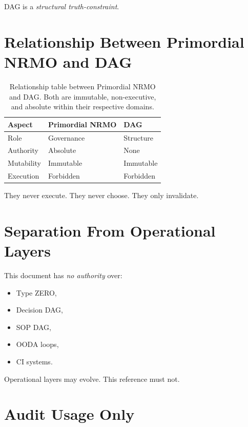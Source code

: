 \noindent
DAG is a \emph{structural truth-constraint}.

\section{Relationship Between Primordial NRMO and DAG}
\label{sec:nrmo-dag-relationship}

\begin{table}[ht]
\centering
\begin{tabular}{lll}
\toprule
\textbf{Aspect} & \textbf{Primordial NRMO} & \textbf{DAG} \\
\midrule
Role & Governance & Structure \\
Authority & Absolute & None \\
Mutability & Immutable & Immutable \\
Execution & Forbidden & Forbidden \\
\bottomrule
\end{tabular}
\caption[Primordial NRMO and DAG]{Relationship table between
Primordial NRMO and DAG. Both are immutable, non-executive, and
absolute within their respective domains.}
\label{tab:nrmo-dag-relationship}
\end{table}

\noindent
They never execute. They never choose. They only invalidate.

\section{Separation From Operational Layers}
\label{sec:foundational-separation}

This document has \emph{no authority} over:

\begin{itemize}
\item Type ZERO,
\item Decision DAG,
\item SOP DAG,
\item OODA loops,
\item CI systems.
\end{itemize}

\noindent
Operational layers may evolve. This reference must not.

\section{Audit Usage Only}
\label{sec:foundational-audit}

